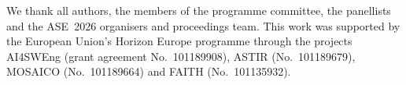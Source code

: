 We thank all authors, the members of the programme committee, the panellists and the ASE~2026 organisers and proceedings team. This work was supported by the European Union's Horizon Europe programme through the projects AI4SWEng (grant agreement No.~101189908), ASTIR (No.~101189679), MOSAICO (No.~101189664) and FAITH (No.~101135932).
